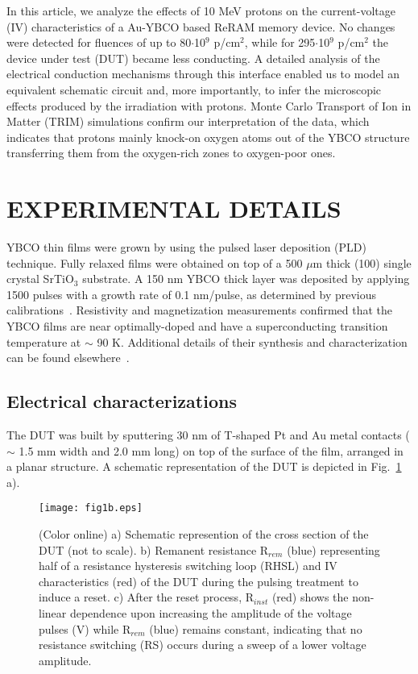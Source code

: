 \documentclass[square,aip,preprint,showkeys,superscriptaddress]{revtex4}
\begin{document}
In this article, we analyze the effects of 10 MeV protons on the current-voltage (IV) characteristics of a Au-YBCO based ReRAM memory device. No changes were detected for fluences of up to 80$\cdot$10$^9$ p/cm$^2$, while for 295$\cdot$10$^9$ p/cm$^2$ the device under test (DUT) became less conducting. A detailed analysis of the electrical conduction mechanisms through this interface enabled us to model an equivalent schematic circuit and, more importantly, to infer the microscopic effects produced by the irradiation with protons. Monte Carlo Transport of Ion in Matter (TRIM) simulations confirm our interpretation of the data, which indicates that protons mainly knock-on oxygen atoms out of the YBCO structure transferring them from the oxygen-rich zones to oxygen-poor ones.   


\section{EXPERIMENTAL DETAILS}

YBCO thin films were grown by using the pulsed laser deposition
(PLD) technique. Fully relaxed films were obtained on top of a 500 $\mu$m thick (100) single crystal SrTiO$_3$ substrate.  A 150 nm YBCO thick layer was deposited by applying 1500 pulses with a growth rate of 0.1 nm/pulse, as determined by previous calibrations~\cite{Khan19}. Resistivity and magnetization measurements confirmed that the YBCO films are near optimally-doped and have a superconducting transition temperature at $\sim$ 90 K. Additional details of their synthesis and characterization can be found elsewhere~\cite{Huhtinen01,Paturi04,Peurla07,Khan19}.

\subsection{Electrical characterizations}

The DUT was built by sputtering 30 nm of T-shaped Pt and Au metal contacts ($\sim$ 1.5 mm width and 2.0 mm long) on top of the surface of the film, arranged in a planar structure. A schematic representation of the DUT is depicted in Fig.~\ref{fig:device} a). 


\begin{figure}[htp]
	\vspace{-0mm}
	\centerline{\texttt{[image: fig1b.eps]}}
	\vspace{-0mm}\caption{(Color online) a) Schematic represention of the cross section of the DUT (not to scale). b) Remanent resistance R$_{rem}$ (blue) representing half of a resistance hysteresis switching loop (RHSL) and IV characteristics (red) of the DUT during the pulsing treatment to induce a reset. c) After the reset process, R$_{inst}$ (red) shows the non-linear dependence upon increasing the amplitude of the voltage pulses (V) while R$_{rem}$ (blue) remains constant, indicating that no resistance switching (RS) occurs during a sweep of a lower voltage amplitude.} \vspace{-0mm}
	\label{fig:device}
\end{figure}
\end{document}
